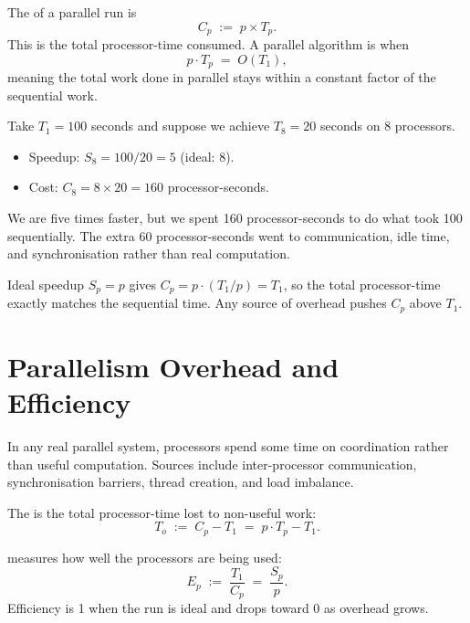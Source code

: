 \begin{ppdefn}
The  of a parallel run is
\[
  C_p \;:=\; p \times T_p.
\]
This is the total processor-time consumed.
A parallel algorithm is  when
\[
  p \cdot T_p \;=\; O(T_1),
\]
meaning the total work done in parallel stays within a constant factor of
the sequential work.
\end{ppdefn}

\begin{ppexample}
Take $T_1 = 100$ seconds and suppose we achieve $T_8 = 20$ seconds on
8 processors.
\begin{itemize}
  \item Speedup: $S_8 = 100/20 = 5$ \quad (ideal: $8$).
  \item Cost: $C_8 = 8 \times 20 = 160$ processor-seconds.
\end{itemize}
We are five times faster, but we spent 160 processor-seconds to do what
took 100 sequentially.
The extra 60 processor-seconds went to communication, idle time, and
synchronisation rather than real computation.
\end{ppexample}

\begin{ppnote}
Ideal speedup $S_p = p$ gives $C_p = p \cdot (T_1/p) = T_1$, so the
total processor-time exactly matches the sequential time.
Any source of overhead pushes $C_p$ above $T_1$.
\end{ppnote}

\section{Parallelism Overhead and Efficiency}

In any real parallel system, processors spend some time on coordination
rather than useful computation.
Sources include inter-processor communication, synchronisation barriers,
thread creation, and load imbalance.

\begin{ppdefn}
The  is the total processor-time lost to
non-useful work:
\[
  T_o \;:=\; C_p - T_1 \;=\; p \cdot T_p - T_1.
\]
\end{ppdefn}

\begin{ppdefn}
 measures how well the processors are being used:
\[
  E_p \;:=\; \frac{T_1}{C_p} \;=\; \frac{S_p}{p}.
\]
Efficiency is 1 when the run is ideal and drops toward 0 as overhead
grows.
\end{ppdefn}

